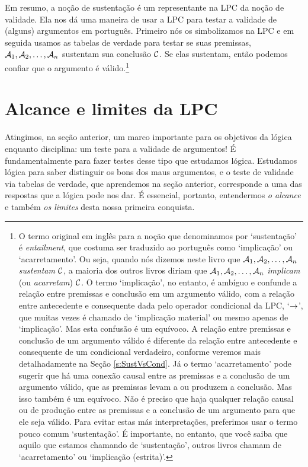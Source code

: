 Em resumo, a noção de sustentação é um representante na LPC da noção de validade.
Ela nos dá uma maneira de usar a LPC para testar a validade de (alguns) argumentos em português.
Primeiro nós os simbolizamos na LPC e em seguida usamos as tabelas de verdade para testar se suas premissas, $\mathcal{A}_1, \mathcal{A}_2, \ldots, \mathcal{A}_n$ sustentam sua conclusão $\mathcal{C}$.
Se elas sustentam, então podemos confiar que o argumento é válido.\footnote{
	O termo original em inglês para a noção que denominamos por `sustentação' é \emph{entailment}, que costuma ser traduzido ao português como `implicação' ou `acarretamento'.
	Ou seja, quando nós dizemos neste livro que $\mathcal{A}_1, \mathcal{A}_2, \ldots, \mathcal{A}_n$ \emph{sustentam} $\mathcal{C}$, a maioria dos outros livros diriam que $\mathcal{A}_1, \mathcal{A}_2, \ldots, \mathcal{A}_n$ \emph{implicam} (ou \emph{acarretam}) $\mathcal{C}$.
	O termo `implicação', no entanto, é ambíguo e confunde a relação entre premissas e conclusão em um argumento válido, com a relação entre antecedente e consequente dada pelo operador condicional da LPC, `$\rightarrow$', que muitas vezes é chamado de `implicação material' ou mesmo apenas de `implicação'.
	Mas esta confusão é um equívoco.
	A relação entre premissas e conclusão de um argumento válido é diferente da relação entre antecedente e consequente de um condicional verdadeiro, conforme veremos mais detalhadamente na Seção \ref{s:SustVsCond}.
	Já o termo `acarretamento' pode sugerir que há uma conexão causal entre as premissas e a conclusão de um argumento válido, que as premissas levam a ou produzem a conclusão.
	Mas isso também é um equívoco.
	Não é preciso que haja qualquer relação causal ou de produção entre as premissas e a conclusão de um argumento para que ele seja válido.
	Para evitar estas más interpretações, preferimos usar o termo pouco comum `sustentação'.
	É importante, no entanto, que você saiba que aquilo que estamos chamando de `sustentação', outros livros chamam de `acarretamento' ou `implicação (estrita)'.}


\section{Alcance e limites da LPC}\label{s:ParadoxesOfMaterialConditional}
Atingimos, na seção anterior, um marco importante para os objetivos da lógica enquanto disciplina: um teste para a validade de argumentos!
É fundamentalmente para fazer testes desse tipo que estudamos lógica.
Estudamos lógica para saber distinguir os bons dos maus argumentos, e o teste de validade via tabelas de verdade, que aprendemos na seção anterior, corresponde a uma das respostas que a lógica pode nos dar.
É essencial, portanto, entendermos \emph{o alcance} e também \emph{os limites} desta nossa primeira conquista.

